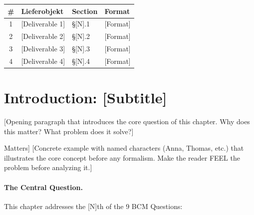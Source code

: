 \begin{tcolorbox}[
    colback=purple!5!white,
    colframe=purple!75!black,
    title={\textbf{Chapter Scope: Ziel / In-Scope / Out-of-Scope / Lieferobjekte}},
    fonttitle=\bfseries
]
\begin{center}
\small
\renewcommand{\arraystretch}{1.1}
\begin{tabular}{@{}clll@{}}
\toprule
\textbf{\#} & \textbf{Lieferobjekt} & \textbf{Section} & \textbf{Format} \\
\midrule
1 & [Deliverable 1] & \S[N].1 & [Format] \\
2 & [Deliverable 2] & \S[N].2 & [Format] \\
3 & [Deliverable 3] & \S[N].3 & [Format] \\
4 & [Deliverable 4] & \S[N].4 & [Format] \\
\bottomrule
\end{tabular}
\end{center}

\end{tcolorbox}



\section{Introduction: [Subtitle]}
\label{sec:[label]-intro}



[Opening paragraph that introduces the core question of this chapter.
Why does this matter? What problem does it solve?]

\begin{intuition}[Why [Topic] Matters]
[Concrete example with named characters (Anna, Thomas, etc.)
that illustrates the core concept before any formalism.
Make the reader FEEL the problem before analyzing it.]
\end{intuition}

\paragraph{The Central Question.}
This chapter addresses the [N]th of the 9 BCM Questions:

